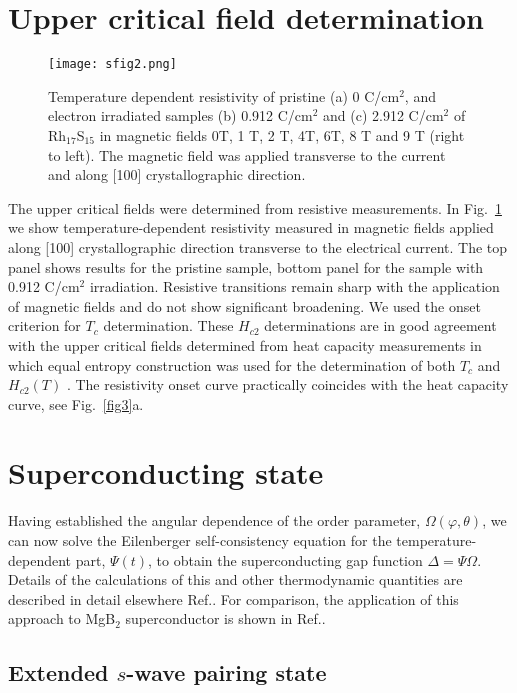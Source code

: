 \documentclass[aps,pra,reprint,superscriptaddress,floatfix]{revtex4-2}
\begin{document}
\section{Upper critical field determination}

\begin{figure}
\texttt{[image: sfig2.png]}%
\caption{\label{sfig2} Temperature dependent resistivity of pristine (a) 0 C/cm$^2$, and electron irradiated samples (b) 0.912 C/cm$^2$ and (c) 2.912 C/cm$^2$ of Rh$_{17}$S$_{15}$ in magnetic fields 0T, 1 T, 2 T, 4T, 6T, 8 T and 9 T (right to left). The magnetic field was applied transverse to the current and along [100] crystallographic direction. }
\end{figure}

The upper critical fields were determined from resistive measurements. 
In Fig.~\ref{sfig2} we show temperature-dependent resistivity measured in magnetic fields applied along [100] crystallographic direction transverse to the electrical current. The top panel shows results for the pristine sample, bottom panel for the sample with 0.912 C/cm$^2$ irradiation. Resistive transitions remain sharp with the application of magnetic fields and do not show significant broadening. 
We used the onset criterion for $T_c$ determination.
These $H_{c2}$ determinations are in good agreement with the upper critical fields determined from heat capacity measurements in which equal entropy construction was used for the determination of both $T_c$ and $H_{c2}(T)$ \cite{Uhlarz2010}. The resistivity onset curve practically coincides with the heat capacity curve, see Fig.~\ref{fig3}a.

\section{Superconducting state}


Having established the angular dependence of the order parameter, $\Omega(\varphi,\theta)$, we can now solve the Eilenberger self-consistency equation for the temperature-dependent part, $\Psi(t)$, to obtain the superconducting gap function $\Delta=\Psi \Omega$. Details of the calculations of this and other thermodynamic quantities are described in detail elsewhere Ref.\cite{Kogan2009b,Prozorov2011}. For comparison, the application of this approach to MgB$_2$ superconductor is shown in Ref.\cite{Kim2019}.


\subsection{Extended $s$-wave pairing state}\label{subsec:app:extendeds}
\end{document}
